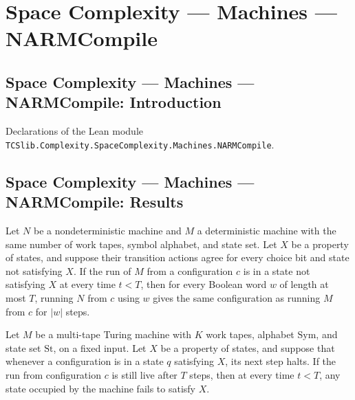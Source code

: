 \section{Space Complexity --- Machines --- NARMCompile}
\subsection*{Space Complexity --- Machines --- NARMCompile: Introduction}

Declarations of the Lean module \texttt{TCSlib.Complexity.SpaceComplexity.Machines.NARMCompile}.

\subsection*{Space Complexity --- Machines --- NARMCompile: Results}

\begin{theorem}
\label{Complexity.LogProg.ndtm_runWith_eq_runFrom}
\leanok
{}
Let $N$ be a nondeterministic machine and $M$ a deterministic machine with the same
number of work tapes, symbol alphabet, and state set. Let $X$ be a property of states,
and suppose their transition actions agree for every choice bit and state not satisfying
$X$. If the run of $M$ from a configuration $c$ is in a state not satisfying $X$ at
every time $t<T$, then for every Boolean word $w$ of length at most $T$, running $N$
from $c$ using $w$ gives the same configuration as running $M$ from $c$ for $|w|$ steps.
\end{theorem}

\begin{lemma}
\label{Complexity.LogProg.avoid_of_live}
\leanok
{}
Let $M$ be a multi-tape Turing machine with $K$ work tapes, alphabet $\mathrm{Sym}$, and
state set $\mathrm{St}$, on a fixed input. Let $X$ be a property of states, and suppose
that whenever a configuration is in a state $q$ satisfying $X$, its next step halts. If
the run from configuration $c$ is still live after $T$ steps, then at every time $t<T$,
any state occupied by the machine fails to satisfy $X$.
\end{lemma}

